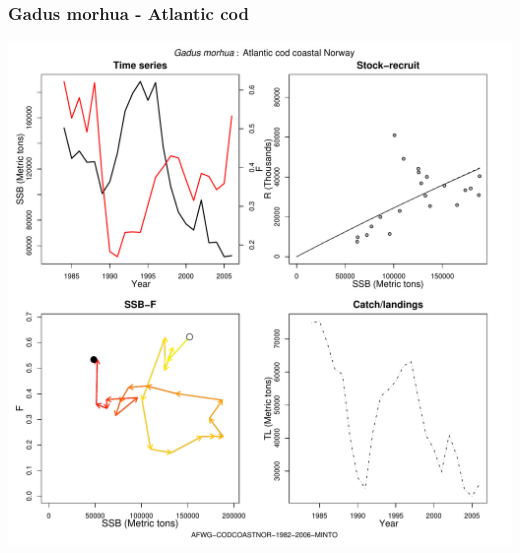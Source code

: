 \subsubsection{Gadus morhua - Atlantic cod}
\begin{center}
\includegraphics[width=1.2\textwidth]{../R/figures/AFWG-CODCOASTNOR-1982-2006-MINTO.pdf}
\end{center}


